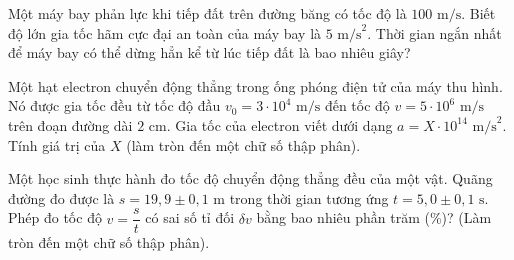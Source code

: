 \begin{ex}
	Một máy bay phản lực khi tiếp đất trên đường băng có tốc độ là $100\text{ m/s}$. Biết độ lớn gia tốc hãm cực đại an toàn của máy bay là $5\text{ m/s}^2$. Thời gian ngắn nhất để máy bay có thể dừng hẳn kể từ lúc tiếp đất là bao nhiêu giây?
	\par{}
\end{ex}

\begin{ex}
	Một hạt electron chuyển động thẳng trong ống phóng điện tử của máy thu hình. Nó được gia tốc đều từ tốc độ đầu $v_0 = 3 \cdot 10^4\text{ m/s}$ đến tốc độ $v = 5 \cdot 10^6\text{ m/s}$ trên đoạn đường dài $2\text{ cm}$. Gia tốc của electron viết dưới dạng $a = X \cdot 10^{14}\text{ m/s}^2$. Tính giá trị của $X$ (làm tròn đến một chữ số thập phân).
	\par{}
\end{ex}

\begin{ex}
	Một học sinh thực hành đo tốc độ chuyển động thẳng đều của một vật. Quãng đường đo được là $s = 19{,}9 \pm 0{,}1\text{ m}$ trong thời gian tương ứng $t = 5{,}0 \pm 0{,}1\text{ s}$. Phép đo tốc độ $v = \dfrac{s}{t}$ có sai số tỉ đối $\delta v$ bằng bao nhiêu phần trăm (\%)? (Làm tròn đến một chữ số thập phân).
	\par{}
\end{ex}

